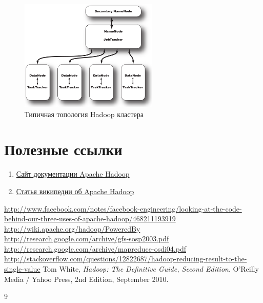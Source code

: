 \documentclass[a4paper,11pt]{article}
\begin{document}
\begin{figure}[h!]
  \centering
  \includegraphics[height=200px]{res/master_slaves_cluster.png}
  \caption{Типичная топология Hadoop кластера}
  \label{fig:master_slaves_cluster}
\end{figure}

\section*{Полезные ссылки}
\begin{enumerate}
  \item \href{http://hadoop.apache.org/docs/stable/}{Сайт документации Apache Hadoop}
  \item \href{http://ru.wikipedia.org/wiki/Hadoop}{Статья википедии об Apache Hadoop}
\end{enumerate}

\begin{thebibliography}{4}
        \href{http://www.facebook.com/notes/facebook-engineering/looking-at-the-code-behind-our-three-uses-of-apache-hadoop/468211193919}{http://www.facebook.com/notes/facebook-engineering/looking-at-the-code-behind-our-three-uses-of-apache-hadoop/468211193919}
        \href{http://wiki.apache.org/hadoop/PoweredBy}{http://wiki.apache.org/hadoop/PoweredBy}
        \href{http://research.google.com/archive/gfs-sosp2003.pdf}{http://research.google.com/archive/gfs-sosp2003.pdf}
        \href{http://research.google.com/archive/mapreduce-osdi04.pdf}{http://research.google.com/archive/mapreduce-osdi04.pdf}
        \href{http://stackoverflow.com/questions/12822687/hadoop-reducing-result-to-the-single-value}{http://stackoverflow.com/questions/12822687/hadoop-reducing-result-to-the-single-value}
        Tom White,
        \emph{Hadoop: The Definitive Guide, Second Edition}.
        O'Reilly Media / Yahoo Press,
        2nd Edition,
        September 2010.
\end{thebibliography}{9}
\end{document}

